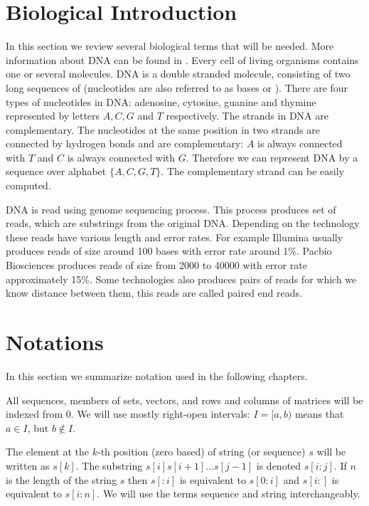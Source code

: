 \section{Biological Introduction}



In this section we review several biological terms that will be needed. More
information about DNA can be found in
\cite{BiologyForDummies,UnderstandingBioinformatics}.  Every cell of living
organisms contains one or several  molecules. DNA is a double
stranded molecule, consisting of two long sequences of 
(nucleotides are also referred to as bases or ). There are
four types of nucleotides in DNA: adenosine, cytosine, guanine and thymine
represented by letters $A,C,G$ and $T$ respectively. 
The strands in DNA are complementary. The
nucleotides at the same position in two strands are connected by hydrogen bonds
and are complementary: $A$ is always connected with $T$ and $C$ is always
connected with $G$. Therefore we can represent DNA by a sequence over alphabet
$\{A,C,G,T\}$. The complementary strand can be easily computed.

DNA is read using genome sequencing process. This process produces
set of reads, which are substrings from the original DNA. 
Depending on the technology these reads have various length and error rates.
For example Illumina usually produces reads of size around 100 bases with
error rate around 1\%. Pacbio Biosciences produces
reads of size from 2000 to 40000 with error rate approximately 15\%.
Some technologies also produces pairs of reads for which we know
distance between them, this reads are called paired end reads.

\section{Notations}

In this section we summarize notation used in the following
chapters.

All sequences, members of sets, vectors, and rows and columns of matrices will
be indexed from $0$. We will use mostly right-open intervals: $I=[a,b)$ means
that $a\in I$, but $b\notin I$. 

The element at the $k$-th position (zero based) of string (or sequence) $s$ will
be written as $s[k]$. The substring $s[i]s[i+1]\dots s[j-1]$ is denoted
$s[i:j]$.  If $n$ is the length of the string $s$ then $s[:i]$ is equivalent to
$s[0:i]$ and $s[i:]$ is equivalent to $s[i:n]$.  We will use the terms sequence
and string interchangeably.
